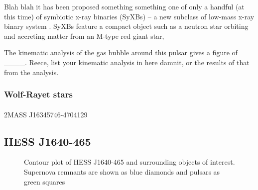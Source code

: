 \documentclass[a4paper, titlepage, oneside]{article}
\begin{document}
\begin{multicols}{2}
Blah blah it has been proposed something something one of only a handful (at this time) of symbiotic x-ray binaries (SyXBs) -- a new subclass of low-mass x-ray binary system \parencite{Nespoli:2010}. SyXBs feature a compact object such as a neutron star orbiting and accreting matter from an M-type red giant star,

The kinematic analysis of the gas bubble around this pulsar gives a figure of \_\_\_\_. Reece, list your kinematic analysis in here damnit, or the results of that from the analysis.

\subsubsection{Wolf-Rayet stars}
\paragraph{}
2MASS J16345746-4704129

\subsection{HESS J1640-465}

\begin{figure}[H]
  \centering
  \caption{Contour plot of HESS J1640-465 and surrounding objects of interest. Supernova remnants are shown as blue diamonds and pulsars as green squares}
  \label{fig:hess40}
\end{figure}


\end{multicols}
\end{document}
